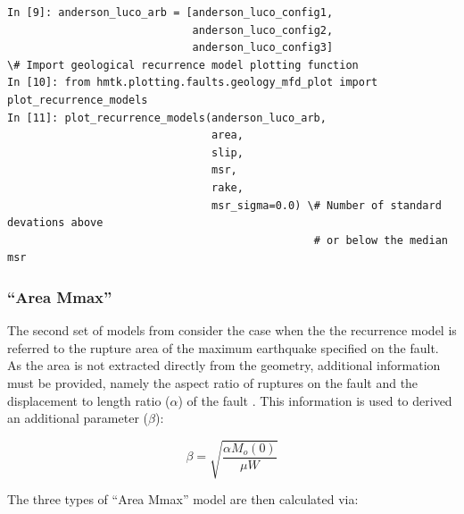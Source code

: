 \begin{Verbatim}[frame=single, commandchars=\\\{\}, fontsize=\scriptsize]
In [9]: anderson_luco_arb = [anderson_luco_config1,
                             anderson_luco_config2,
                             anderson_luco_config3]
\# Import geological recurrence model plotting function
In [10]: from hmtk.plotting.faults.geology_mfd_plot import plot_recurrence_models
In [11]: plot_recurrence_models(anderson_luco_arb,
                                area,
                                slip,
                                msr,
                                rake,
                                msr_sigma=0.0) \# Number of standard devations above
                                                # or below the median msr 
\end{Verbatim}



\subsubsection{\cite{AndersonLuco1983} ``Area Mmax''}

The second set of models from \cite{AndersonLuco1983} consider the case when the the recurrence model is referred to the rupture area of the maximum earthquake specified on the fault. As the area is not extracted directly from the geometry, additional information must be provided, namely the aspect ratio of ruptures on the fault and the displacement to length ratio ($\alpha$) of the fault \cite{Bungum2007}. This information is used to derived an additional parameter ($\beta$):

\begin{equation}
\beta=\sqrt{\frac{\alpha M_o \left( 0 \right)}{\mu W}}
\end{equation}

The three types of \cite{AndersonLuco1983} ``Area Mmax'' model are then calculated via:

